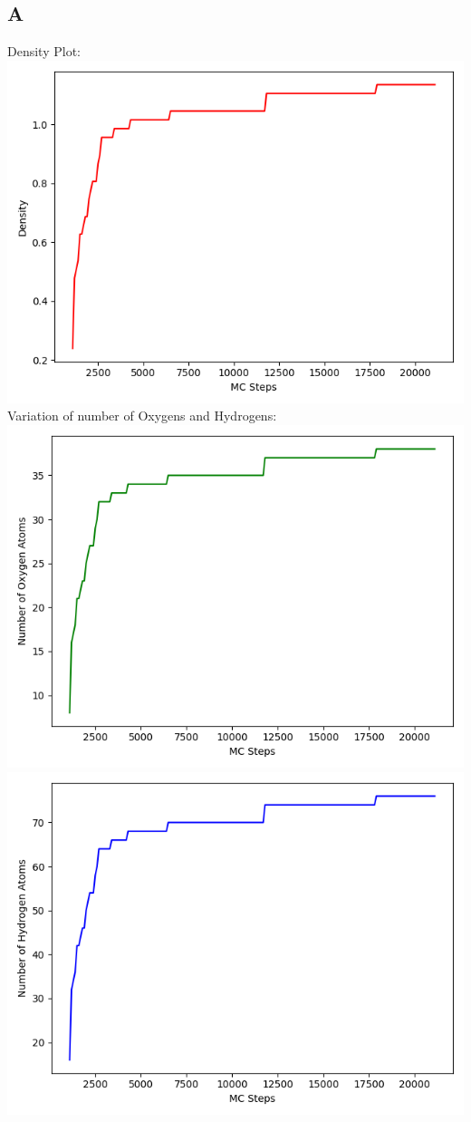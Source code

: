 \documentclass[11pt]{article}
\begin{document}
\subsection{A}
Density Plot: \\
\includegraphics[scale=0.5]{Q3a_Density.png}\\
Variation of number of Oxygens and Hydrogens: \\
\includegraphics[scale=0.5]{Q3a_nO.png}
\includegraphics[scale=0.5]{Q3a_nH.png}\\
\end{document}
